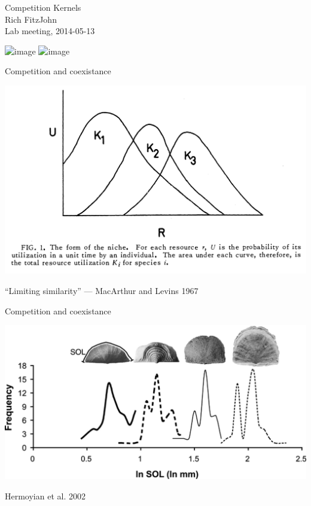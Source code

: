 \documentclass[12pt]{beamer}
\begin{document}
\begin{frame}
  \thispagestyle{empty}
  \begin{center}
    \sf
    {\Huge Competition Kernels}\\[2ex]
    {\large Rich FitzJohn}\\[3em]
    {Lab meeting, 2014-05-13}
  \end{center}
\end{frame}

%
\begin{frame}
  \begin{center}
    \includegraphics<1>[height=\textheight]{pics/plant_competition} 
    \includegraphics<2>[width=\textwidth]{pics/animal_competition}
  \end{center}
\end{frame}

\begin{frame}[t]{Competition and coexistance}
  \begin{center}
    \includegraphics[width=.8\textwidth]{pics/limiting_similarity.png}
    
    \small ``Limiting similarity'' --- MacArthur and Levins 1967
  \end{center}
\end{frame}

\begin{frame}[t]{Competition and coexistance}
  \begin{center}
    \includegraphics[width=.8\textwidth]{pics/hermoyian-2002.jpg}
    
    Hermoyian et al. 2002
  \end{center}
\end{frame}
\end{document}
